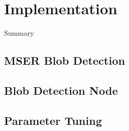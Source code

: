 \section{Implementation}
\label{sec:impl}

Summary

\subsection{MSER Blob Detection}

\subsection{Blob Detection Node}

\subsection{Parameter Tuning}